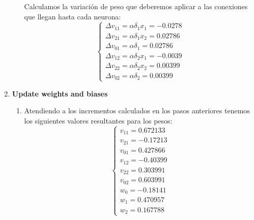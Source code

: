 \begin{problem}[4]
\begin{enumerate}
\begin{enumerate}
Calculamos la variación de peso que deberemos aplicar a las conexiones que llegan hasta cada neurona:
\[\left\{ \begin{array}{l}
Δv_{11}= αδ_1x_1 = -0.0278 \\
Δv_{21}= αδ_1x_2 = 0.02786 \\
Δv_{01}= αδ_1    = 0.02786 \\
Δv_{12}= αδ_2x_1 = -0.0039 \\
Δv_{22}= αδ_2x_2 = 0.00399 \\
Δv_{02}= αδ_2    = 0.00399
\end{array}\right.\]

\end{enumerate}
\item \textbf{Update weights and biases}
\begin{enumerate}
\item Atendiendo a los incrementos calculados en los pasos anteriores tenemos los siguientes valores resultantes para los pesos:
\[\left\{ \begin{array}{l}
v_{11} =  0.672133\\
v_{21} =  -0.17213\\
v_{01} =  0.427866\\
v_{12} =  -0.40399\\
v_{22} =  0.303991\\
v_{02} =  0.603991\\
w_0     =  -0.18141\\
w_1     =  0.470957\\
w_2     =  0.167788
\end{array}\right.\]
\end{enumerate}
\end{enumerate}

\end{problem}

